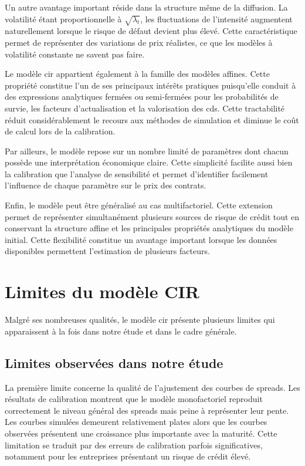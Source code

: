 Un autre avantage important réside dans la structure même de la diffusion. La volatilité étant proportionnelle à $\sqrt{\lambda_t}$, les fluctuations de l'intensité augmentent naturellement lorsque le risque de défaut devient plus élevé. Cette caractéristique permet de représenter des variations de prix réalistes, ce que les modèles à volatilité constante ne savent pas faire.

Le modèle \gls{cir} appartient également à la famille des modèles affines. Cette propriété constitue l'un de ses principaux intérêts pratiques puisqu'elle conduit à des expressions analytiques fermées ou semi-fermées pour les probabilités de survie, les facteurs d'actualisation et la valorisation des \gls{cds}. Cette tractabilité réduit considérablement le recours aux méthodes de simulation et diminue le coût de calcul lors de la calibration.

Par ailleurs, le modèle repose sur un nombre limité de paramètres dont chacun possède une interprétation économique claire. Cette simplicité facilite aussi bien la calibration que l'analyse de sensibilité et permet d'identifier facilement l'influence de chaque paramètre sur le prix des contrats.

Enfin, le modèle peut être généralisé au cas multifactoriel. Cette extension permet de représenter simultanément plusieurs sources de risque de crédit tout en conservant la structure affine et les principales propriétés analytiques du modèle initial. Cette flexibilité constitue un avantage important lorsque les données disponibles permettent l'estimation de plusieurs facteurs.


\section{Limites du modèle CIR}

Malgré ses nombreuses qualités, le modèle \gls{cir} présente plusieurs limites qui apparaissent à la fois dans notre étude et dans le cadre générale.

\subsection{Limites observées dans notre étude}

La première limite concerne la qualité de l'ajustement des courbes de spreads. Les résultats de calibration montrent que le modèle monofactoriel reproduit correctement le niveau général des spreads mais peine à représenter leur pente. Les courbes simulées demeurent relativement plates alors que les courbes observées présentent une croissance plus importante avec la maturité. Cette limitation se traduit par des erreurs de calibration parfois significatives, notamment pour les entreprises présentant un risque de crédit élevé.

